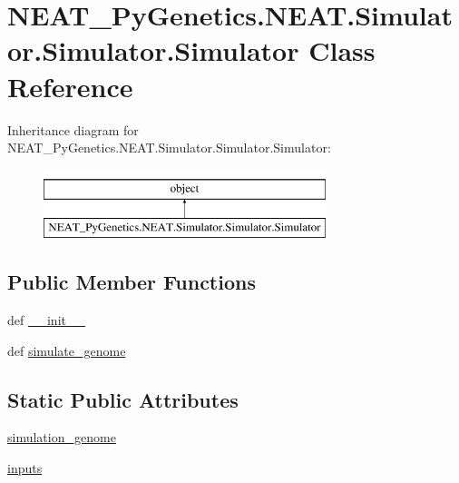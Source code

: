 \hypertarget{classNEAT__PyGenetics_1_1NEAT_1_1Simulator_1_1Simulator_1_1Simulator}{}\section{N\+E\+A\+T\+\_\+\+Py\+Genetics.\+N\+E\+A\+T.\+Simulator.\+Simulator.\+Simulator Class Reference}
\label{classNEAT__PyGenetics_1_1NEAT_1_1Simulator_1_1Simulator_1_1Simulator}
Inheritance diagram for N\+E\+A\+T\+\_\+\+Py\+Genetics.\+N\+E\+A\+T.\+Simulator.\+Simulator.\+Simulator\+:\begin{figure}[H]
\begin{center}
\leavevmode
\includegraphics[height=2.000000cm]{classNEAT__PyGenetics_1_1NEAT_1_1Simulator_1_1Simulator_1_1Simulator}
\end{center}
\end{figure}
\subsection*{Public Member Functions}
\begin{DoxyCompactItemize}
\item 
def \hyperlink{classNEAT__PyGenetics_1_1NEAT_1_1Simulator_1_1Simulator_1_1Simulator_ab768445b7d9b16282919f062e0a42761}{\+\_\+\+\_\+init\+\_\+\+\_\+}
\item 
def \hyperlink{classNEAT__PyGenetics_1_1NEAT_1_1Simulator_1_1Simulator_1_1Simulator_a0e362a7174cae20d0a23b69109ac15bc}{simulate\+\_\+genome}
\end{DoxyCompactItemize}
\subsection*{Static Public Attributes}
\begin{DoxyCompactItemize}
\item 
\hyperlink{classNEAT__PyGenetics_1_1NEAT_1_1Simulator_1_1Simulator_1_1Simulator_abbacbfee6def9b5025447526cfb6152d}{simulation\+\_\+genome}
\item 
\hyperlink{classNEAT__PyGenetics_1_1NEAT_1_1Simulator_1_1Simulator_1_1Simulator_a6ebf16f89e5a3f48064b85f3acd0c9e9}{inputs}
\end{DoxyCompactItemize}


